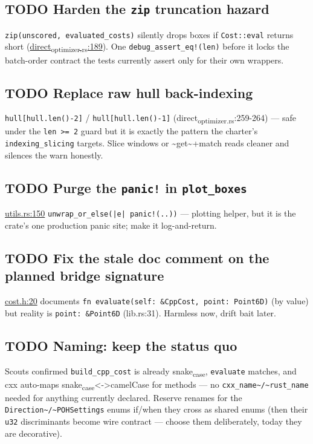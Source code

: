 \documentclass[11pt]{article}
\begin{document}
\subsection{{\bfseries\sffamily TODO} Harden the \texttt{zip} truncation hazard}
\label{sec:orgb2419de}
\texttt{zip(unscored, evaluated\_costs)} silently drops boxes if \texttt{Cost::eval}
returns short (\href{rust/direct-rs/src/direct\_optimizer.rs}{direct\textsubscript{optimizer.rs}:189}). One
\texttt{debug\_assert\_eq!(len)} before it locks the batch-order contract the
tests currently assert only for their own wrappers.
\subsection{{\bfseries\sffamily TODO} Replace raw hull back-indexing}
\label{sec:orgbed1df1}
\texttt{hull[hull.len()-2]} / \texttt{hull[hull.len()-1]}
(direct\textsubscript{optimizer.rs}:259-264) — safe under the \texttt{len >= 2} guard but it
is exactly the pattern the charter's \texttt{indexing\_slicing} targets. Slice
windows or \textasciitilde{}get\textasciitilde{}+match reads cleaner and silences the warn honestly.
\subsection{{\bfseries\sffamily TODO} Purge the \texttt{panic!} in \texttt{plot\_boxes}}
\label{sec:org23caf58}
\href{rust/direct-rs/src/utils.rs}{utils.rs:150} \texttt{unwrap\_or\_else(|e| panic!(..))} — plotting helper, but
it is the crate's one production panic site; make it log-and-return.
\subsection{{\bfseries\sffamily TODO} Fix the stale doc comment on the planned bridge signature}
\label{sec:org2eb9134}
\href{include/domain/cost.h}{cost.h:20} documents \texttt{fn evaluate(self: \&CppCost, point: Point6D)}
(by value) but reality is \texttt{point: \&Point6D} (lib.rs:31). Harmless now,
drift bait later.
\subsection{{\bfseries\sffamily TODO} Naming: keep the status quo}
\label{sec:org43d45ec}
Scouts confirmed \texttt{build\_cpp\_cost} is already snake\textsubscript{case}, \texttt{evaluate}
matches, and cxx auto-maps snake\textsubscript{case}<->camelCase for methods — no
\texttt{cxx\_name\textasciitilde{}/\textasciitilde{}rust\_name} needed for anything currently declared. Reserve
renames for the \texttt{Direction\textasciitilde{}/\textasciitilde{}POHSettings} enums if/when they cross as
shared enums (then their \texttt{u32} discriminants become wire contract —
choose them deliberately, today they are decorative).
\end{document}
